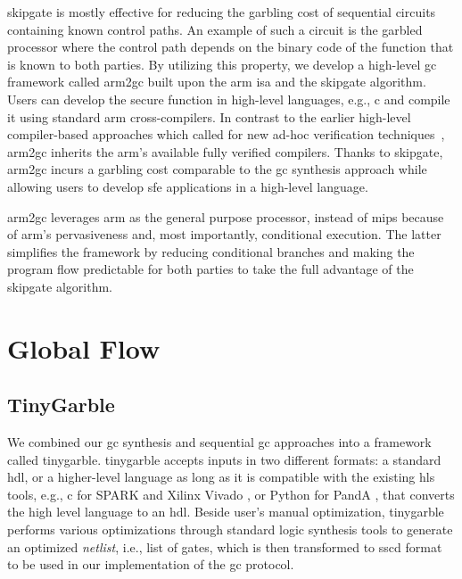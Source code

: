 \gls{skipgate} is mostly effective for reducing the garbling cost of sequential circuits containing known control paths.
An example of such a circuit is the garbled processor where the control path depends on the binary code of the function that is known to both parties.
By utilizing this property, we develop a high-level \acrshort{gc} framework called \gls{arm2gc} built upon the \gls{arm} \acrshort{isa} and the \gls{skipgate} algorithm.
Users can develop the secure function in high-level languages, e.g., \gls{c} and compile it using standard \gls{arm} cross-compilers.
In contrast to the earlier high-level compiler-based approaches which called for new ad-hoc verification techniques~\cite{rastogi2014wysteria,demmler2015aby,liu2015oblivm,mood2016frigate}, \gls{arm2gc} inherits the \gls{arm}'s available fully verified compilers.
Thanks to \gls{skipgate}, \gls{arm2gc} incurs a garbling cost comparable to the \acrshort{gc} synthesis approach while allowing users to develop \acrshort{sfe} applications in a high-level language.

\gls{arm2gc} leverages \gls{arm} as the general purpose processor, instead of \gls{mips} because of \gls{arm}'s pervasiveness and, most importantly, conditional execution.
The latter simplifies the framework by reducing conditional branches and making the program flow predictable for both parties to take the full advantage of the \gls{skipgate} algorithm.

\section{Global Flow}
\subsection{TinyGarble}
We combined our \acrshort{gc} synthesis and sequential \acrshort{gc} approaches into a framework called \gls{tinygarble}.
\gls{tinygarble} accepts inputs in two different formats: a standard \acrfull{hdl}, or a higher-level language as long as it is compatible with the existing \acrfull{hls} tools, e.g., \gls{c} for  SPARK \cite{Gupta2004} and Xilinx Vivado \cite{tool:Vivado}, or Python for PandA \cite{tool:PandA}, that converts the high level language to an \acrshort{hdl}.
Beside user's manual optimization, \gls{tinygarble} performs various optimizations through standard logic synthesis tools to generate an optimized \textit{\gls{netlist}}, i.e., list of gates, which is then transformed to \acrfull{sscd} format to be used in our implementation of the \acrshort{gc} protocol.

